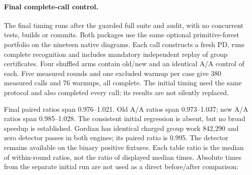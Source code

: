 \paragraph{Final complete-call control.}
The final timing runs after the guarded full suite and audit, with no concurrent
tests, builds or commits. Both packages use the same optional primitive-forest
portfolio on the nineteen native diagrams. Each call constructs a fresh PD,
runs complete recognition and includes mandatory independent replay of group
certificates. Four shuffled arms contain old/new and an identical A/A control
of each. Five measured rounds and one excluded warmup per case give 380
measured calls and 76 warmups, all complete. The initial timing used the same
protocol and also completed every call; its results are not silently replaced.

Final paired ratios span 0.976--1.021. Old A/A ratios span 0.973--1.037;
new A/A ratios span 0.985--1.028. The consistent initial regression is absent,
but no broad speedup is established. Gordian has identical charged group work
842,290 and zero detector passes in both engines; its paired ratio is 0.995.
The detector remains available on the binary positive fixtures. Each table
ratio is the median of within-round ratios, not the ratio of displayed median
times. Absolute times from the separate initial run are not used as a direct
before/after comparison:


